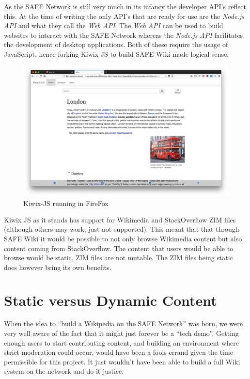 As the SAFE Network is still very much in its infancy the developer API's reflect this. At the time of writing the only API's that are ready for use are the \textit{Node.js API} and what they call the \textit{Web API}. The \textit{Web API} can be used to build websites to interact with the SAFE Network whereas the \textit{Node.js API} facilitates the development of desktop applications. Both of these require the usage of JavaScript, hence forking Kiwix JS to build SAFE Wiki made logical sense.

\begin{figure}
	\begin{center}
			\includegraphics[width=\textwidth]{images/kiwix-js-extension}
		\caption{Kiwix-JS running in FireFox}
		\label{fig:kiwix-firefox}
	\end{center}
\end{figure}

Kiwix JS as it stands has support for Wikimedia and StackOverflow ZIM files (although others may work, just not supported). This meant that that through SAFE Wiki it would be possible to not only browse Wikimedia content but also content coming from StackOverflow. The content that users would be able to browse would be static, ZIM files are not mutable. The ZIM files being static does however bring its own benefits.

\section{Static versus Dynamic Content}

When the idea to ``build a Wikipedia on the SAFE Network'' was born, we were very well aware of the fact that it might just forever be a ``tech demo''. Getting enough users to start contributing content, and building an environment where strict moderation could occur, would have been a fools-errand given the time permissible for this project. It just wouldn't have been able to build a full Wiki system on the network and do it justice.

